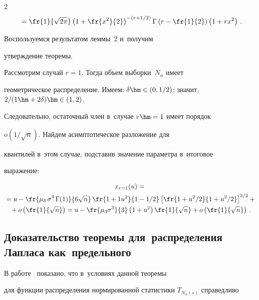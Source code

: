 \begin{multicols}{2}
\begin{multline*}
{}=\fr{1}{\sqrt{2\pi}}\left(1+\fr{x^{2}}{2}\right)^{-\left(r+{1}/{2}\right)}\Gamma

\left(r-\fr{1}{2}\right)\left(1+rx^{2}\right)\,.

\end{multline*}

Воспользуемся результатом леммы~2 и~получим

 утверждение теоремы.





Рассмотрим случай $r=1$. Тогда объем выборки~$N_n$ имеет

геометрическое распределение. Имеем:  $\delta \hm\in \left(0,1/2

\right)$; значит,   $2/(1\hm+2\delta) \hm\in \left(1,2\right)$.

Следовательно, остаточный член в~случае $r\hm=1$ имеет порядок

$o\left(1/\sqrt{n}\right)$. Найдем асимптотическое разложение для

квантилей в~этом случае, подставив значение параметра в~итоговое

выражение:

\begin{multline*}

x_{r=1}(u)={}\\

{}=u-\fr{\mu_3\, \sigma^{3}\, \Gamma(1)}{6\sqrt{n}}\,

\fr{1+1 u^{2}}{1-1/2}   \left[{\fr{1+u^{2}/2}{1+u^{2}/2}}\right]^{3/2}+{}\\

{}+o\left(\fr{1}{\sqrt{n}}\right) =

u-\fr{\mu_3 \sigma^{3}}{3}\left( 1+u^{2}\right)\fr{1}{\sqrt{n}}+

o\left(\fr{1}{\sqrt{n}}\right)\,.

\end{multline*}





\subsection{Доказательство теоремы для~распределения Лапласа как~предельного}



В работе~\cite{BenKorGal} показано, что в~условиях данной теоремы 

для функции распределения нормированной статистики $T_{N_{n}(s)}$ справедливо 


\end{multicols}
